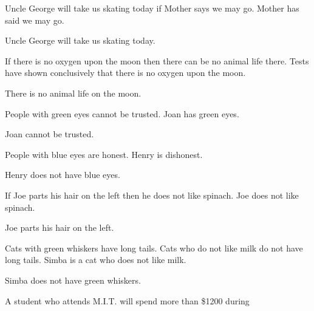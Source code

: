 \documentclass[11pt]{book}
\theoremstyle{bkplain}
\theoremstyle{XIplainnote}
\theoremstyle{bkplain}
\theoremstyle{bkplain}
\begin{document}
\begin{exercisecols}
\begin{exlist}
\item \begin{hyp}Uncle George will take us skating today if Mother says we may go.
      Mother has said we may go.\end{hyp}
      \begin{thmclaim}Uncle George will take us skating today.\end{thmclaim}
\item \begin{hyp}If there is no oxygen upon the moon then there can be no animal
      life there. Tests have shown conclusively that there is no oxygen upon the
      moon.\end{hyp}
      \begin{thmclaim}There is no animal life on the moon.\end{thmclaim}
\item \begin{hyp}People with green eyes cannot be trusted. Joan has green
      eyes.\end{hyp}
      \begin{thmclaim}Joan cannot be trusted.\end{thmclaim}
\item \begin{hyp}People with blue eyes are honest. Henry is dishonest.\end{hyp}
      \begin{thmclaim}Henry does not have blue eyes.\end{thmclaim}
\item \begin{hyp}If Joe parts his hair on the left then he does not like spinach.
      Joe does not like spinach.\end{hyp}
      \begin{thmclaim}Joe parts his hair on the left.\end{thmclaim}
\item \begin{hyp}Cats with green whiskers have long tails. Cats who do not like
      milk do not have long tails. Simba is a cat who does not like milk.\end{hyp}
      \begin{thmclaim}Simba does not have green whiskers.\end{thmclaim}
\item \begin{hyp}A student who attends M.I.T. will spend more than \$1200 during

\end{hyp}
\end{exlist}
\end{exercisecols}
\end{document}
